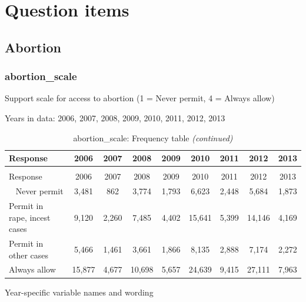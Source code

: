 \documentclass[12pt]{article}
\begin{document}
\newpage

\section{Question items}\label{question-items}

\subsection{Abortion}\label{abortion}

\subsubsection{abortion\_scale}\label{abortion_scale}

Support scale for access to abortion (1 = Never permit, 4 = Always
allow)

Years in data: 2006, 2007, 2008, 2009, 2010, 2011, 2012,
2013\begingroup\fontsize{10}{12}\selectfont

\begin{longtable}[t]{lcccccccc}
\caption{\label{tab:unnamed-chunk-4}abortion\_scale: Frequency table}\\
\toprule
Response & 2006 & 2007 & 2008 & 2009 & 2010 & 2011 & 2012 & 2013\\
\midrule
\endfirsthead
\caption[]{abortion\_scale: Frequency table \textit{(continued)}}\\
\toprule
Response & 2006 & 2007 & 2008 & 2009 & 2010 & 2011 & 2012 & 2013\\
\midrule
\endhead
\
\endfoot
\bottomrule
\endlastfoot
Never permit & 3,481 & 862 & 3,774 & 1,793 & 6,623 & 2,448 & 5,684 & 1,873\\
Permit in rape, incest cases & 9,120 & 2,260 & 7,485 & 4,402 & 15,641 & 5,399 & 14,146 & 4,169\\
Permit in other cases & 5,466 & 1,461 & 3,661 & 1,866 & 8,135 & 2,888 & 7,174 & 2,272\\
Always allow & 15,877 & 4,677 & 10,698 & 5,657 & 24,639 & 9,415 & 27,111 & 7,963\\*
\end{longtable}

\endgroup{}

Year-specific variable names and wording
\end{document}
